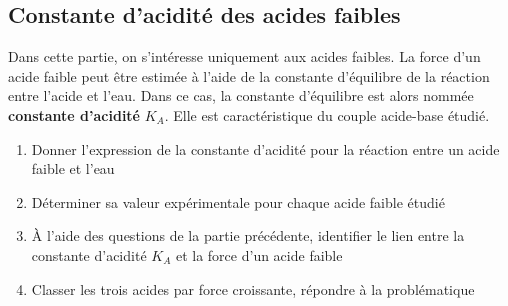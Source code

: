 \documentclass[a4paper,11pt,fleqn]{article}%
\begin{document}
	\subsection{Constante d'acidité des acides faibles}
	Dans cette partie, on s'intéresse uniquement aux acides faibles. La force d'un acide faible peut être estimée à l'aide de la constante d'équilibre de la réaction entre l'acide et l'eau. Dans ce cas, la constante d'équilibre est alors nommée \textbf{constante d'acidité} $K_A$. Elle est caractéristique du couple acide-base étudié.
	\begin{enumerate}[resume]
	\item Donner l'expression de la constante d'acidité pour la réaction entre un acide faible et l'eau
	\item Déterminer sa valeur expérimentale pour chaque acide faible étudié
	\item À l'aide des questions de la partie précédente, identifier le lien entre la constante d'acidité $K_A$ et la force d'un acide faible
	\item Classer les trois acides par force croissante, répondre à la problématique
	\end{enumerate}
	
\end{document}
